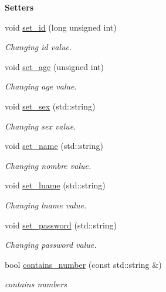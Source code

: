 \begin{Indent}{\bf Setters}\par
\begin{DoxyCompactItemize}
\item 
void \hyperlink{class_cuser_af24e3067528b741a49410b0372f4ef42}{set\+\_\+id} (long unsigned int)
\begin{DoxyCompactList}\small\item\em Changing id value. \end{DoxyCompactList}\item 
void \hyperlink{class_cuser_a21de7d9c58f6128adc959e2c008b7deb}{set\+\_\+age} (unsigned int)
\begin{DoxyCompactList}\small\item\em Changing age value. \end{DoxyCompactList}\item 
void \hyperlink{class_cuser_a5e3c1e2f75f9638714423f1372ea098a}{set\+\_\+sex} (std\+::string)
\begin{DoxyCompactList}\small\item\em Changing sex value. \end{DoxyCompactList}\item 
void \hyperlink{class_cuser_a54a15a99fc54cd882e87bb1ba66c3434}{set\+\_\+name} (std\+::string)
\begin{DoxyCompactList}\small\item\em Changing nombre value. \end{DoxyCompactList}\item 
void \hyperlink{class_cuser_a4062d5c81e4aafbb7ac0b9256df66b71}{set\+\_\+lname} (std\+::string)
\begin{DoxyCompactList}\small\item\em Changing lname value. \end{DoxyCompactList}\item 
void \hyperlink{class_cuser_ab1b88a55109edbfb16d6c05fc093fd1e}{set\+\_\+password} (std\+::string)
\begin{DoxyCompactList}\small\item\em Changing password value. \end{DoxyCompactList}\item 
bool \hyperlink{class_cuser_a110db4f47ac17223247019cbb6535fe1}{contains\+\_\+number} (const std\+::string \&)
\begin{DoxyCompactList}\small\item\em contains numbers \end{DoxyCompactList}\end{DoxyCompactItemize}
\end{Indent}
